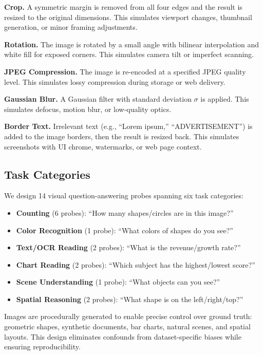 \documentclass[10pt,twocolumn,letterpaper]{article}
\begin{document}
\textbf{Crop.} A symmetric margin is removed from all four edges and the result is resized to the original dimensions. This simulates viewport changes, thumbnail generation, or minor framing adjustments.

\textbf{Rotation.} The image is rotated by a small angle with bilinear interpolation and white fill for exposed corners. This simulates camera tilt or imperfect scanning.

\textbf{JPEG Compression.} The image is re-encoded at a specified JPEG quality level. This simulates lossy compression during storage or web delivery.

\textbf{Gaussian Blur.} A Gaussian filter with standard deviation $\sigma$ is applied. This simulates defocus, motion blur, or low-quality optics.

\textbf{Border Text.} Irrelevant text (e.g., ``Lorem ipsum,'' ``ADVERTISEMENT'') is added to the image borders, then the result is resized back. This simulates screenshots with UI chrome, watermarks, or web page context.

\subsection{Task Categories}

We design 14 visual question-answering probes spanning six task categories:
\begin{itemize}
    \item \textbf{Counting} (6 probes): ``How many shapes/circles are in this image?''
    \item \textbf{Color Recognition} (1 probe): ``What colors of shapes do you see?''
    \item \textbf{Text/OCR Reading} (2 probes): ``What is the revenue/growth rate?''
    \item \textbf{Chart Reading} (2 probes): ``Which subject has the highest/lowest score?''
    \item \textbf{Scene Understanding} (1 probe): ``What objects can you see?''
    \item \textbf{Spatial Reasoning} (2 probes): ``What shape is on the left/right/top?''
\end{itemize}

Images are procedurally generated to enable precise control over ground truth: geometric shapes, synthetic documents, bar charts, natural scenes, and spatial layouts. This design eliminates confounds from dataset-specific biases while ensuring reproducibility.
\end{document}
